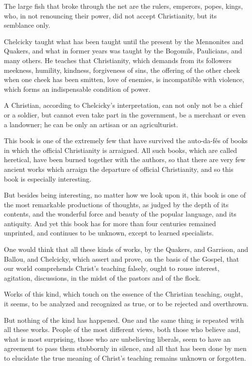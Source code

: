 \documentclass{book}
\begin{document}
The large fish that broke through the net are the rulers, emperors, popes, kings, who, in not renouncing their power, did not accept Christianity, but its semblance only.

Chelcicky taught what has been taught until the present by the Mennonites and Quakers, and what in former years was taught by the Bogomils, Paulicians, and many others. He teaches that Christianity, which demands from its followers meekness, humility, kindness, forgiveness of sins, the offering of the other cheek when one cheek has been smitten, love of enemies, is incompatible with violence, which forms an indispensable condition of power.

A Christian, according to Chelcicky’s interpretation, can not only not be a chief or a soldier, but cannot even take part in the government, be a merchant or even a landowner; he can be only an artisan or an agriculturist.

This book is one of the extremely few that have survived the auto-da-fés of books in which the official Christianity is arraigned. All such books, which are called heretical, have been burned together with the authors, so that there are very few ancient works which arraign the departure of official Christianity, and so this book is especially interesting.

But besides being interesting, no matter how we look upon it, this book is one of the most remarkable productions of thoughts, as judged by the depth of its contents, and the wonderful force and beauty of the popular language, and its antiquity. And yet this book has for more than four centuries remained unprinted, and continues to be unknown, except to learned specialists.

One would think that all these kinds of works, by the Quakers, and Garrison, and Ballou, and Chelcicky, which assert and prove, on the basis of the Gospel, that our world comprehends Christ’s teaching falsely, ought to rouse interest, agitation, discussions, in the midst of the pastors and of the flock.

Works of this kind, which touch on the essence of the Christian teaching, ought, it seems, to be analyzed and recognized as true, or to be rejected and overthrown.

But nothing of the kind has happened. One and the same thing is repeated with all these works. People of the most different views, both those who believe and, what is most surprising, those who are unbelieving liberals, seem to have an agreement to pass them stubbornly in silence, and all that has been done by men to elucidate the true meaning of Christ’s teaching remains unknown or forgotten.
\end{document}

